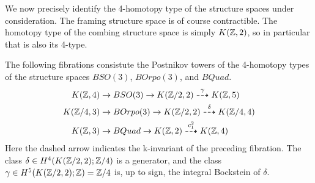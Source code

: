 \documentclass{amsart}
\begin{document}

We now precisely identify the 4-homotopy type of the structure spaces under consideration.  The framing structure space is of course contractible.  The homotopy type of the combing structure space is simply $K(\mathbb Z,2)$, so in particular that is also its 4-type.

\begin{proposition}
The following fibrations consistute the Postnikov towers of the 4-homotopy types of the structure spaces $BSO(3)$, $BOrpo(3)$, and $BQuad$.
\begin{align}
K(\mathbb Z,4) \rightarrow & \; BSO(3) \rightarrow K(\mathbb Z/2,2) \overset{\gamma}{\dashrightarrow} K(\mathbb Z,5) \nonumber \\
K(\mathbb Z/4,3) \rightarrow & \; BOrpo(3) \rightarrow K(\mathbb Z/2,2) \overset{\delta}{\dashrightarrow} K(\mathbb Z/4,4) \nonumber \\
K(\mathbb Z,3) \rightarrow & \; BQuad \rightarrow K(\mathbb Z,2) \overset{c_1^2}{\dashrightarrow} K(\mathbb Z,4) \nonumber
\end{align}
\nid Here the dashed arrow indicates the k-invariant of the preceding fibration.  The class $\delta \in H^4(K(\mathbb Z/2,2);\mathbb Z/4)$ is a generator, and the class $\gamma \in H^5(K(\mathbb Z/2,2);\mathbb Z) = \mathbb Z/4$ is, up to sign, the integral Bockstein of $\delta$. %
\end{proposition}
\end{document}
